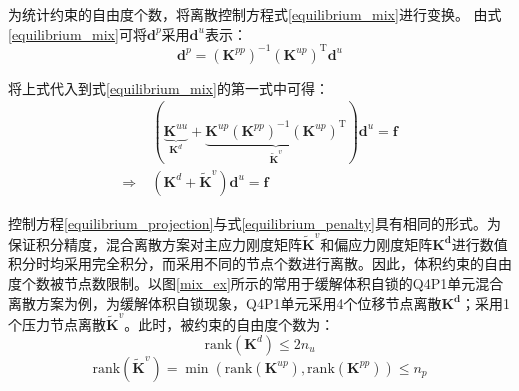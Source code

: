 为统计约束的自由度个数，将离散控制方程式\eqref{equilibrium_mix}进行变换。
由式\eqref{equilibrium_mix}可将$\boldsymbol d^p$采用$\boldsymbol d^u$表示：
\begin{equation}
    \boldsymbol d^p = (\boldsymbol K^{pp})^{-1} (\boldsymbol K^{up})^{\mathrm T} \boldsymbol d^u
\end{equation}

将上式代入到式\eqref{equilibrium_mix}的第一式中可得：
\begin{equation}\label{equilibrium_projection}
    \begin{split}
        &(\underbrace{\boldsymbol K^{uu}}_{\boldsymbol K^d} +  \underbrace{\boldsymbol K^{up}(\boldsymbol K^{pp})^{-1}(\boldsymbol K^{up})^{\mathrm T}}_{\tilde{\boldsymbol K}^v}) \boldsymbol d^u = \boldsymbol f \\
        \Rightarrow\;& (\boldsymbol K^d + \tilde{\boldsymbol K}^v) \boldsymbol d^u= \boldsymbol f
    \end{split}
\end{equation}

控制方程\eqref{equilibrium_projection}与式\eqref{equilibrium_penalty}具有相同的形式。为保证积分精度，混合离散方案对主应力刚度矩阵$\tilde{\boldsymbol K}^v$和偏应力刚度矩阵$\boldsymbol{K^d}$进行数值积分时均采用完全积分，而采用不同的节点个数进行离散。因此，体积约束的自由度个数被节点数限制。以图\ref{mix_ex}所示的常用于缓解体积自锁的Q4P1单元混合离散方案为例，为缓解体积自锁现象，Q4P1单元采用4个位移节点离散$\boldsymbol{K^d}$；采用1个压力节点离散$\tilde{\boldsymbol K}^v$。此时，被约束的自由度个数为：
\begin{equation}
    \mathrm{rank}(\boldsymbol K^d)\le 2n_u
\end{equation}
\begin{equation}
    \mathrm{rank}(\tilde{\boldsymbol K}^v)=\min(\mathrm{rank}({\boldsymbol K}^{up}),\mathrm{rank}({\boldsymbol K}^{pp}))\le n_p
\end{equation}

